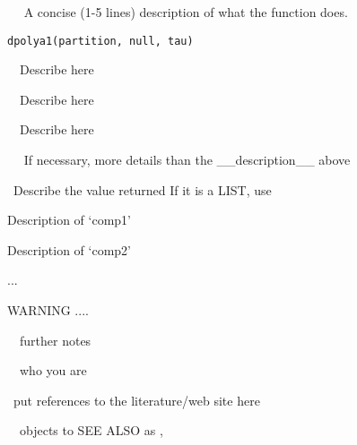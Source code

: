\begin{Description}\relax
~~ A concise (1-5 lines) description of what the function does. ~~\end{Description}
\begin{Usage}
\begin{verbatim}
dpolya1(partition, null, tau)
\end{verbatim}
\end{Usage}
\begin{Arguments}
\begin{ldescription}
\item[\code{partition}] ~~Describe  here~~ 
\item[\code{null}] ~~Describe  here~~ 
\item[\code{tau}] ~~Describe  here~~ 
\end{ldescription}
\end{Arguments}
\begin{Details}\relax
~~ If necessary, more details than the __description__  above ~~\end{Details}
\begin{Value}
~Describe the value returned
If it is a LIST, use
\begin{ldescription}
\item[\code{comp1 }] Description of `comp1'
\item[\code{comp2 }] Description of `comp2'
\end{ldescription}

...\end{Value}
\begin{Section}{WARNING}
....\end{Section}
\begin{Note}\relax
~~further notes~~\end{Note}
\begin{Author}\relax
~~who you are~~\end{Author}
\begin{References}\relax
~put references to the literature/web site here ~\end{References}
\begin{SeeAlso}\relax
~~objects to SEE ALSO as , ~~~\end{SeeAlso}
